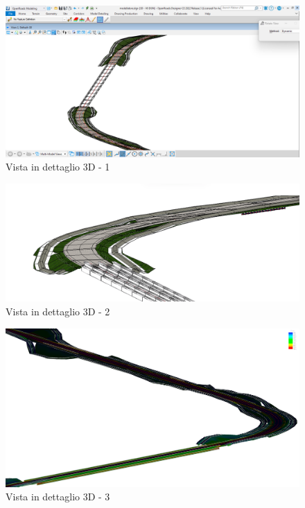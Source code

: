 \begin{figure}[H]
    \includegraphics[width=\textwidth]{Figures/Vista in dettaglio 3D - 1.png}
      \caption{Vista in dettaglio 3D - 1}
      \label{Vista in dettaglio 3D - 1}
\end{figure}

\begin{figure}[H]
    \includegraphics[width=\textwidth]{Figures/Vista in dettaglio 3D - 2.png}
      \caption{Vista in dettaglio 3D - 2}
      \label{Vista in dettaglio 3D - 2}
\end{figure}

\begin{figure}[H]
  \includegraphics[width=\textwidth]{Figures/Vista in dettaglio 3D - 3.png}
    \caption{Vista in dettaglio 3D - 3}
    \label{Vista in dettaglio 3D - 3}
\end{figure}
